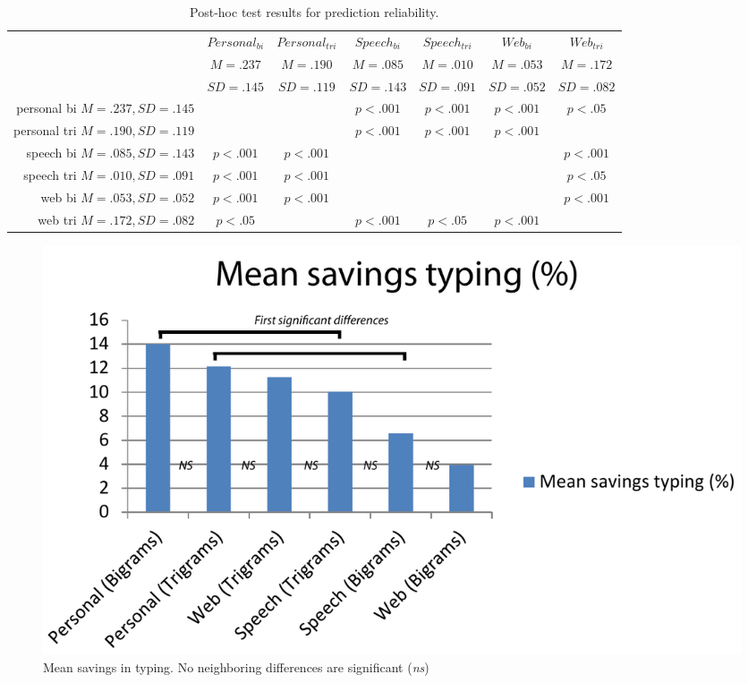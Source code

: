 \documentclass{sigchi}
\begin{document}
\begin{table}
    \centering
    \begin{tabular}{|r|c|c|c|c|c|c|}
    \hline
    ~ & $Personal_{bi}$ & $Personal_{tri}$ & $Speech_{bi}$ & $Speech_{tri}$ & $Web_{bi}$ & $Web_{tri}$ \\
    ~ & $M=.237$ & $M=.190$ & $M=.085$ & $M=.010$ & $M=.053$ & $M=.172$ \\
    ~ & $SD=.145$ & $SD=.119$ & $SD=.143$ & $SD=.091$ & $SD=.052$ & $SD=.082$ \\ \hline
    personal bi $M=.237,SD=.145$  & ~           & ~            & $p<.001$  & $p<.001$   & $p<.001$ & $p<.05$  \\ \hline
    personal tri $M=.190,SD=.119$ & ~           & ~            & $p<.001$  & $p<.001$   & $p<.001$ & ~        \\ \hline
    speech bi $M=.085,SD=.143$    & $p<.001$    & $p<.001$     & ~         & ~          & ~        & $p<.001$ \\ \hline
    speech tri $M=.010,SD=.091$   & $p<.001$    & $p<.001$     & ~         & ~          & ~        & $p<.05$  \\ \hline
    web bi $M=.053,SD=.052$       & $p<.001$    & $p<.001$     & ~         & ~          & ~        & $p<.001$ \\ \hline
    web tri $M=.172,SD=.082$       & $p<.05$     & ~            & $p<.001$  & $p<.05$    & $p<.001$ & ~        \\ \hline
    \end{tabular}
    \caption {Post-hoc test results for prediction reliability.}
    \label{tab:reliability}
\end{table}

\endgroup

\begin{figure}
   \centering
   \includegraphics[width=\columnwidth]{Figs/typingSavingsChart.pdf}
   \caption{Mean savings in typing. No neighboring differences are
     significant ({\em ns})}
   \label{fig:savings}
\end{figure}
\end{document}
